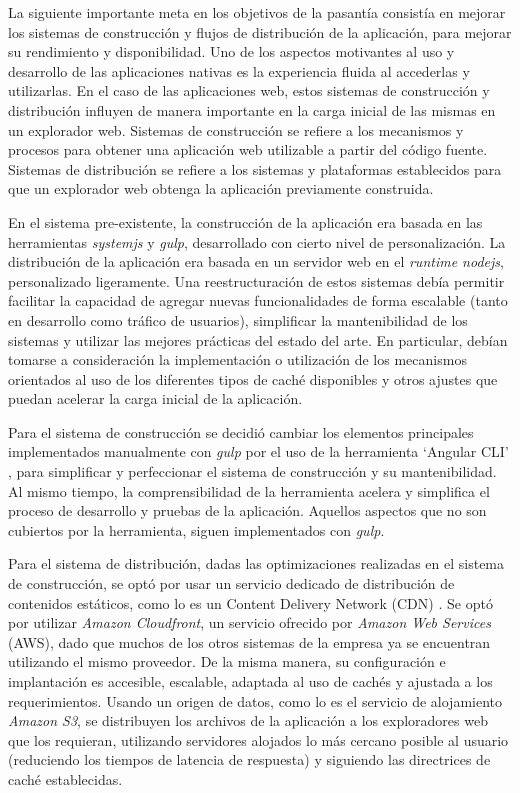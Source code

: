 La siguiente importante meta en los objetivos de la pasantía consistía en mejorar los sistemas de construcción y flujos de distribución de la aplicación, para mejorar su rendimiento y disponibilidad. Uno de los aspectos motivantes al uso y desarrollo de las aplicaciones nativas es la experiencia fluida al accederlas y utilizarlas. En el caso de las aplicaciones web, estos sistemas de construcción y distribución influyen de manera importante en la carga inicial de las mismas en un explorador web. Sistemas de construcción se refiere a los mecanismos y procesos para obtener una aplicación web utilizable a partir del código fuente. Sistemas de distribución se refiere a los sistemas y plataformas establecidos para que un explorador web obtenga la aplicación previamente construida.

En el sistema pre-existente, la construcción de la aplicación era basada en las herramientas \textit{systemjs} y \textit{gulp}, desarrollado con cierto nivel de personalización. La distribución de la aplicación era basada en un servidor web en el \textit{runtime nodejs}, personalizado ligeramente. Una reestructuración de estos sistemas debía permitir facilitar la capacidad de agregar nuevas funcionalidades de forma escalable (tanto en desarrollo como tráfico de usuarios), simplificar la mantenibilidad de los sistemas y utilizar las mejores prácticas del estado del arte. En particular, debían tomarse a consideración la implementación o utilización de los mecanismos orientados al uso de los diferentes tipos de caché disponibles y otros ajustes que puedan acelerar la carga inicial de la aplicación.

Para el sistema de construcción se decidió cambiar los elementos principales implementados manualmente con \textit{gulp} por el uso de la herramienta `Angular CLI' \cite{angularcli}, para simplificar y perfeccionar el sistema de construcción y su mantenibilidad. Al mismo tiempo, la comprensibilidad de la herramienta acelera y simplifica el proceso de desarrollo y pruebas de la aplicación. Aquellos aspectos que no son cubiertos por la herramienta, siguen implementados con \textit{gulp}.

Para el sistema de distribución, dadas las optimizaciones realizadas en el sistema de construcción, se optó por usar un servicio dedicado de distribución de contenidos estáticos, como lo es un Content Delivery Network (CDN) \cite{cdn}. Se optó por utilizar \textit{Amazon Cloudfront}, un servicio ofrecido por \textit{Amazon Web Services} (AWS), dado que muchos de los otros sistemas de la empresa ya se encuentran utilizando el mismo proveedor. De la misma manera, su configuración e implantación es accesible, escalable, adaptada al uso de cachés y ajustada a los requerimientos. Usando un origen de datos, como lo es el servicio de alojamiento \textit{Amazon S3}, se distribuyen los archivos de la aplicación a los exploradores web que los requieran, utilizando servidores alojados lo más cercano posible al usuario (reduciendo los tiempos de latencia de respuesta) y siguiendo las directrices de caché establecidas.

